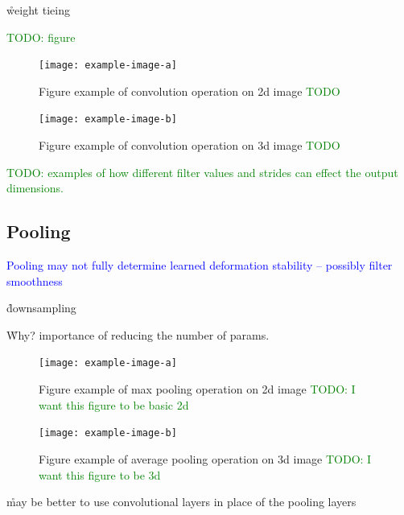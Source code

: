 

\r{weight tieing}


\textcolor{green}{TODO: figure}

\begin{figure}[htp]
	\centering
	\texttt{[image: example-image-a]}\hfil
	\caption{Figure example of convolution operation on 2d image \textcolor{green}{TODO}}
	\label{fig:conv_2d_example_calc}
\end{figure}

\begin{figure}[htp]
	\centering
	\texttt{[image: example-image-b]}\hfil
	\caption{Figure example of convolution operation on 3d image \textcolor{green}{TODO}}
	\label{fig:conv_2d_depth_example_calc}
\end{figure}

\textcolor{green}{TODO: examples of how different filter values and strides can effect the output dimensions.}




\subsection{Pooling}


\textcolor{blue}{Pooling may not fully determine learned deformation stability -- possibly filter smoothness\cite{ruderman2018learned}}

\r{downsampling}

\r{Why? importance of reducing the number of params.}




\begin{figure}[htp]
	\centering
	\texttt{[image: example-image-a]}\hfil
	\caption{Figure example of max pooling operation on 2d image \textcolor{green}{TODO: I want this figure to be basic 2d}}
	\label{fig:pooling_max_2d_ex_a}
\end{figure}

\begin{figure}[htp]
	\centering
	\texttt{[image: example-image-b]}\hfil
	\caption{Figure example of average pooling operation on 3d image \textcolor{green}{TODO: I want this figure to be 3d}}
	\label{fig:pooling_avg_3d_ex_a}
\end{figure}


\r{may be better to use convolutional layers in place of the pooling layers\cite{springenberg2014striving}}
